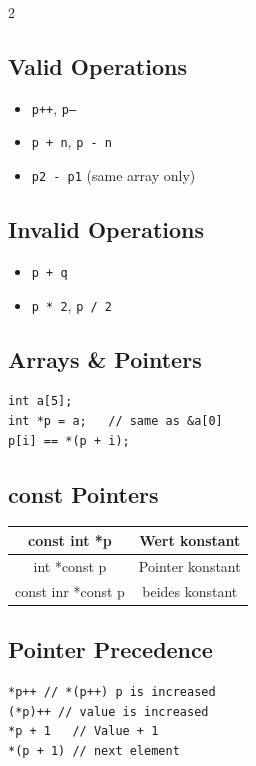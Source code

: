 \documentclass[a4paper,9pt]{article}
\begin{document}
    \begin{multicols}{2}
        \subsection*{Valid Operations}
        \begin{itemize}
            \item \texttt{p++}, \texttt{p--}
            \item \texttt{p + n}, \texttt{p - n}
            \item \texttt{p2 - p1} (same array only)
        \end{itemize}
        
        \subsection*{Invalid Operations}
        \begin{itemize}
            \item \texttt{p + q}
            \item \texttt{p * 2}, \texttt{p / 2}
        \end{itemize}
        
        \subsection*{Arrays \& Pointers}
        \begin{lstlisting}
int a[5];
int *p = a;   // same as &a[0]
p[i] == *(p + i);
        \end{lstlisting}
        
        \subsection*{const Pointers}
        \begin{tabular}{|c|c|}
            \hline
            const int *p & Wert konstant \\
            \hline
            int *const p & Pointer konstant \\
            \hline
            const inr *const p & beides konstant \\
            \hline
        \end{tabular}
        
        \subsection{Pointer Precedence}
        \begin{lstlisting}
*p++ // *(p++) p is increased
(*p)++ // value is increased
*p + 1   // Value + 1
*(p + 1) // next element
        \end{lstlisting}
        

\end{multicols}
\end{document}
